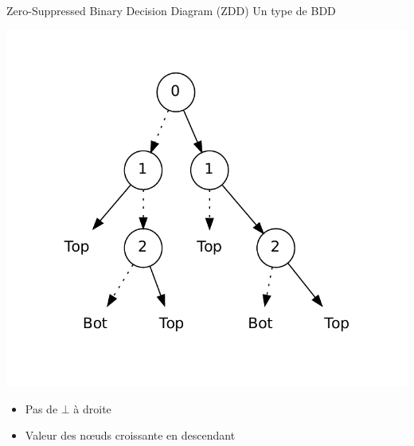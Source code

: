 \documentclass{beamer}
\begin{document}
\begin{frame}{Zero-Suppressed Binary Decision Diagram (ZDD)}
Un type de BDD\\

\begin{center}
\includegraphics[scale=0.3]{../imports/zdd_ex.pdf}
\end{center}
\begin{itemize}
\item Pas de $\bot$ à droite
\item Valeur des n\oe uds croissante en descendant
\end{itemize} 
\end{frame}
\end{document}
